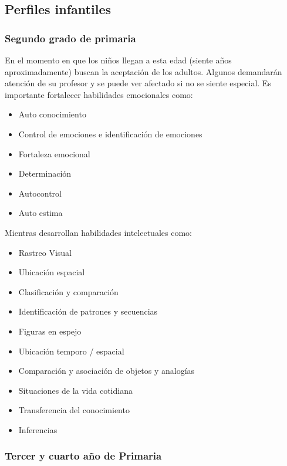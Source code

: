 \documentclass[letterpaper,10pt]{article}
\begin{document}
\subsection{Perfiles infantiles}
\subsubsection{Segundo grado de primaria}

En el momento en que los niños llegan a esta edad (siente años aproximadamente) 
buscan la aceptación de los adultos.  Algunos 
demandarán atención de su profesor y se puede ver afectado si no se siente especial. 
Es importante fortalecer habilidades emocionales como:
\begin{itemize}
	\item Auto conocimiento
	\item Control de emociones e identificación de emociones
	\item Fortaleza emocional
	\item Determinación
	\item Autocontrol
	\item Auto estima
\end{itemize}
Mientras desarrollan habilidades intelectuales como:
\begin{itemize}
	\item Rastreo Visual
	\item Ubicación espacial
	\item Clasificación y comparación
	\item Identificación de patrones y secuencias
	\item Figuras en espejo
	\item Ubicación temporo / espacial
	\item Comparación y asociación de objetos y analogías
	\item Situaciones de la vida cotidiana
	\item Transferencia del conocimiento
	\item Inferencias

\end{itemize}
\subsubsection{Tercer y cuarto año de Primaria}
\end{document}
